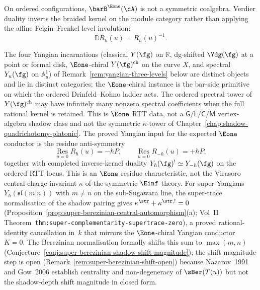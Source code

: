 On ordered configurations, $\barB^{\Eone}(\cA)$ is not a symmetric
coalgebra. Verdier duality inverts the braided kernel on the module
category rather than applying the affine Feigin--Frenkel level
involution:
\[
        \mathbb{D}R_\hbar(u)=R_\hbar(u)^{-1}.
\]

The four Yangian incarnations (classical $Y(\fg)$
on $\mathbb{R}$, dg-shifted $\Ydg(\fg)$ at a point or formal disk,
$\Eone$-chiral $Y(\fg)^{\mathrm{ch}}$ on the curve $X$, and spectral
$Y_{u}(\fg)$ on $\mathbb{A}^{1}_{u}$) of
Remark~\ref{rem:yangian-three-levels} below are distinct objects and
lie in distinct categories; the
$\Eone$-chiral instance is the bar-side primitive on which the
ordered Drinfeld--Kohno ladder acts. The ordered spectral tower
of $Y(\fg)^{\mathrm{ch}}$ may have infinitely many nonzero spectral
coefficients when the full rational kernel is retained. This is
$\Eone$ RTT data, not a $\mathsf{G}/\mathsf{L}/\mathsf{C}/\mathsf{M}$
vertex-algebra shadow class and not the symmetric $\kappa$-tower of
Chapter~\ref{chap:shadow-quadrichotomy-platonic}. The proved
Yangian input for the expected $\Eone$ conductor is the residue
anti-symmetry
\[
 \operatorname*{Res}_{u=0} R_\hbar(u)=-\hbar P,\qquad
 \operatorname*{Res}_{u=0} R_{-\hbar}(u)=+\hbar P,
\]
together with completed inverse-kernel duality
$Y_\hbar(\fg)^!\simeq Y_{-\hbar}(\fg)$ on the ordered RTT locus.
This is an $\Eone$ residue characteristic, not the Virasoro
central-charge invariant $\kappa$ of the symmetric $\Einf$ theory.
For super-Yangians
$Y_\hbar(\mathfrak{sl}(m{|}n))$ with $m\neq n$ on the sub-Sugawara
line, the super-trace normalisation of the shadow pairing gives
$\kappa^{\str} + \kappa^{\str,!} = 0$
(Proposition~\ref{prop:super-berezinian-central-automorphism}(a); Vol~II
Theorem~\texttt{thm:super-complementarity-supertrace-zero}), a
proved rational-identity cancellation in~$k$ that mirrors the
$\Eone$-chiral Yangian conductor~$K=0$. The Berezinian normalisation
formally shifts this sum to $\max(m,n)$
(Conjecture~\ref{conj:super-berezinian-shadow-shift-magnitude}); the
shift-magnitude step is open
(Remark~\ref{rem:super-berezinian-shift-open}) because
Nazarov~1991 and Gow~2006 establish centrality and non-degeneracy of
$\sBer(T(u))$ but not the shadow-depth shift magnitude in closed
form.
